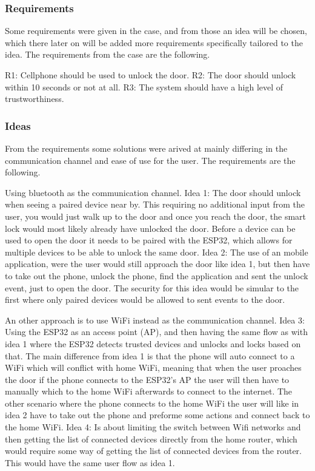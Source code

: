 \subsubsection{Requirements}
Some requirements were given in the case, and from those an idea will be chosen, which there later on will be added more requirements specifically tailored to the idea. The requirements from the case are the following.

R1: Cellphone should be used to unlock the door.
R2: The door should unlock within 10 seconds or not at all.
R3: The system should have a high level of trustworthiness.

\subsubsection{Ideas}
From the requirements some solutions were arived at mainly differing in the communication channel and ease of use for the user. The requirements are the following.

Using bluetooth as the communication channel. Idea 1: The door should unlock when seeing a paired device near by. This requiring no additional input from the user, you would just walk up to the door and once you reach the door, the smart lock would most likely already have unlocked the door. Before a device can be used to open the door it needs to be paired with the ESP32, which allows for multiple devices to be able to unlock the same door. Idea 2: The use of an mobile application, were the user would still approach the door like idea 1, but then have to take out the phone, unlock the phone, find the application and sent the unlock event, just to open the door. The security for this idea would be simular to the first where only paired devices would be allowed to sent events to the door.

An other approach is to use WiFi instead as the communication channel. Idea 3: Using the ESP32 as an access point (AP), and then having the same flow as with idea 1 where the ESP32 detects trusted devices and unlocks and locks based on that. The main difference from idea 1 is that the phone will auto connect to a WiFi which will conflict with home WiFi, meaning that when the user proaches the door if the phone connects to the ESP32's AP the user will then have to manually which to the home WiFi afterwards to connect to the internet. The other scenario where the phone connects to the home WiFi the user will like in idea 2 have to take out the phone and preforme some actions and connect back to the home WiFi. Idea 4: Is about limiting the switch between Wifi networks and then getting the list of connected devices directly from the home router, which would require some way of getting the list of connected devices from the router. This would have the same user flow as idea 1.

